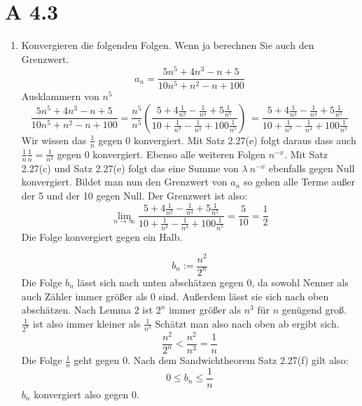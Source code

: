 \documentclass[11pt]{article}
\begin{document}
    \section*{A 4.3}
    \begin{enumerate}[ label= (\roman*) ]
        \item Konvergieren die folgenden Folgen. Wenn ja berechnen Sie auch den Grenzwert.
        \[a_n = \frac{ 5 n^5 + 4 n^3 - n + 5 }{ 10 n ^5 + n^2 - n + 100 } \]
        Ausklammern von \(n^5\)
        \[ 
            \frac{ 5 n^5 + 4 n^3 - n + 5 }{ 10 n ^5 + n^2 - n + 100}
            = \frac{n^5}{n^5} \left( \frac{5 + 4 \frac{1}{n^2} - \frac{1}{n^4} + 5 \frac{1}{n^5} }{ 10 + \frac{1}{n^3} - \frac{1}{n^4} + 100 \frac{1}{n^5} } \right)\
            = \frac{5 + 4 \frac{1}{n^2} - \frac{1}{n^4} + 5 \frac{1}{n^5} }{ 10 + \frac{1}{n^3} - \frac{1}{n^4} + 100 \frac{1}{n^5} }
        \]
        Wir wissen das \(\frac{1}{n}\) gegen 0 konvergiert. Mit Satz 2.27(e) folgt daraus dass auch \(\frac{1}{n} \frac{1}{n} = \frac{1}{n^2}\) gegen 0 konvergiert.
        Ebenso alle weiteren Folgen \(n^{-x}\). Mit Satz 2.27(c) und Satz 2.27(e) folgt das eine Summe von \(\lambda \: n^{-x}\) ebenfalls gegen Null konvergiert.
        Bildet man nun den Grenzwert von \(a_n\) so gehen alle Terme außer der 5 und der 10 gegen Null. Der Grenzwert ist also:
        \[
            \lim_{n \to \infty} \frac{5 + 4 \frac{1}{n^2} - \frac{1}{n^4} + 5 \frac{1}{n^5} }{ 10 + \frac{1}{n^3} - \frac{1}{n^4} + 100 \frac{1}{n^5} }
            = \frac{5}{10} = \frac{1}{2}
        \]
        Die Folge konvergiert gegen ein Halb.

        \[b_n := \frac{n^2}{2^n} \]
        Die Folge \(b_n\) lässt sich nach unten abschätzen gegen 0, da sowohl Nenner als auch Zähler immer größer als 0 sind.
        Außerdem lässt sie sich nach oben abschätzen. Nach Lemma 2 ist \(2^n\) immer größer als \(n^3\) für \(n\) genügend groß.
        \( \frac{1}{2^n} \) ist also immer kleiner als \( \frac{1}{n^3} \)
        Schätzt man also nach oben ab ergibt sich.
        \[ \frac{n^2}{2^n} < \frac{n^2}{n^3} = \frac{1}{n} \]
        Die Folge \(\frac{1}{n}\) geht gegen 0.
        Nach dem Sandwichtheorem Satz 2.27(f) gilt also:
        \[0 \leq b_n \leq \frac{1}{n} \]
        \(b_n\) konvergiert also gegen 0.


\end{enumerate}
\end{document}
